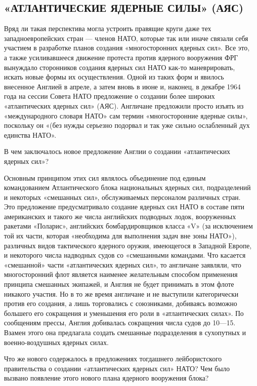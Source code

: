 \documentclass[12pt, a4paper, openany]{book}
\begin{document}
		\subsection[«Атлантические ядерные силы» (АЯС)]{\center «АТЛАНТИЧЕСКИЕ ЯДЕРНЫЕ СИЛЫ» (АЯС)}	
		
		
		Вряд ли такая перспектива могла устроить правящие круги даже тех западноевропейских стран — членов НАТО, которые так или иначе связали себя участием в разработке планов создания «многосторонних ядерных сил». Все это, а также усиливавшееся движение протеста против ядерного вооружения ФРГ вынуждало сторонников создания ядерных сил НАТО как-то маневрировать, искать новые формы их осуществления. Одной из таких форм и явилось внесенное Англией в апреле, а затем вновь в июне и, наконец, в декабре 1964 года на сессии Совета НАТО предложение о создании более широких «атлантических ядерных сил» (АЯС). Англичане предложили просто изъять из «международного словаря НАТО» сам термин «многосторонние ядерные силы», поскольку он «(без нужды серьезно подорвал и так уже сильно ослабленный дух единства НАТО».
		
		В чем заключалось новое предложение Англии о создании «атлантических ядерных сил»?
		
		Основным принципом этих сил являлось объединение под единым командованием Атлантического блока национальных ядерных сил, подразделений и некоторых «смешанных сил», обслуживаемых персоналом различных стран. Это предложение предусматривало создание ядерных сил НАТО в составе пяти американских и такого же числа английских подводных лодок, вооруженных ракетами «Поларис», английских бомбардировщиков класса «V» (за исключением той их части, которая «необходима для выполнения задач вне зоны НАТО»), различных видов тактического ядерного оружия, имеющегося в Западной Европе, и некоторого числа надводных судов со «смешанными командами. Что касается «смешанной» части «атлантических ядерных сил», то англичане заявляли, что многосторонний флот является наименее желательным способом применения принципа смешанных экипажей, и Англия не будет принимать в этом флоте никакого участия. Но в то же время англичане и не выступили категорически против его создания, а лишь торговались с союзниками, добиваясь возможно большего его сокращения и уменьшения его роли в «атлантических силах». По сообщениям прессы, Англия добивалась сокращения числа судов до 10—15. Взамен этого она предлагала создать смешанные подразделения в сухопутных и военно-воздушных ядерных силах.
		
		Что же нового содержалось в предложениях тогдашнего лейбористского правительства о создании «атлантических ядерных сил» НАТО? Чем было вызвано появление этого нового плана ядерного вооружения блока?
		
\end{document}
